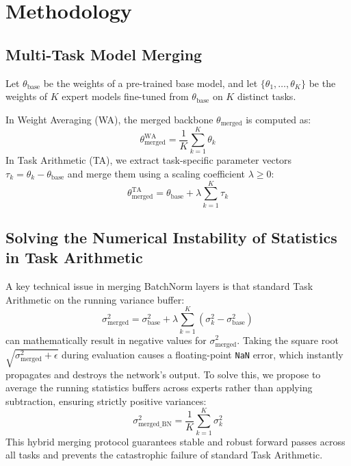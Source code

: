 \documentclass{article}
\theoremstyle{plain}
\theoremstyle{definition}
\theoremstyle{remark}
\begin{document}
\section{Methodology}
\label{sec:method}

\subsection{Multi-Task Model Merging}
Let $\theta_{\text{base}}$ be the weights of a pre-trained base model, and let $\{\theta_1, \dots, \theta_K\}$ be the weights of $K$ expert models fine-tuned from $\theta_{\text{base}}$ on $K$ distinct tasks.

In Weight Averaging (WA), the merged backbone $\theta_{\text{merged}}$ is computed as:
\begin{equation}
\theta_{\text{merged}}^{\text{WA}} = \frac{1}{K} \sum_{k=1}^K \theta_k
\end{equation}
In Task Arithmetic (TA), we extract task-specific parameter vectors $\tau_k = \theta_k - \theta_{\text{base}}$ and merge them using a scaling coefficient $\lambda \ge 0$:
\begin{equation}
\theta_{\text{merged}}^{\text{TA}} = \theta_{\text{base}} + \lambda \sum_{k=1}^K \tau_k
\end{equation}

\subsection{Solving the Numerical Instability of Statistics in Task Arithmetic}
A key technical issue in merging BatchNorm layers is that standard Task Arithmetic on the running variance buffer:
\begin{equation}
\sigma^2_{\text{merged}} = \sigma^2_{\text{base}} + \lambda \sum_{k=1}^K (\sigma^2_k - \sigma^2_{\text{base}})
\end{equation}
can mathematically result in negative values for $\sigma^2_{\text{merged}}$. Taking the square root $\sqrt{\sigma^2_{\text{merged}} + \epsilon}$ during evaluation causes a floating-point \texttt{NaN} error, which instantly propagates and destroys the network's output. To solve this, we propose to average the running statistics buffers across experts rather than applying subtraction, ensuring strictly positive variances:
\begin{equation}
\sigma^2_{\text{merged\_BN}} = \frac{1}{K} \sum_{k=1}^K \sigma^2_k
\end{equation}
This hybrid merging protocol guarantees stable and robust forward passes across all tasks and prevents the catastrophic failure of standard Task Arithmetic.
\end{document}
